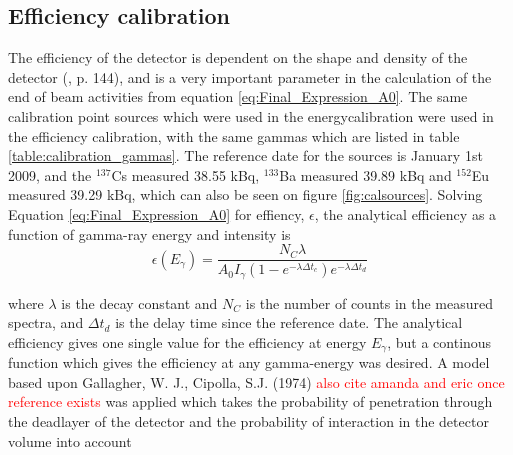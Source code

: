 \subsection{Efficiency calibration}
The efficiency of the detector is dependent on the shape and density of the detector (\cite{Gilmore2008}, p. 144), and is a very important parameter in the calculation of the end of beam activities from equation \ref{eq:Final_Expression_A0}. The same calibration point sources which were used in the energycalibration were used in the efficiency calibration, with the same gammas which are listed in table \ref{table:calibration_gammas}. The reference date for the sources is January 1st 2009, and the $^{137}$Cs measured 38.55 kBq, $^{133}$Ba measured 39.89 kBq and $^{152}$Eu measured 39.29 kBq, which can also be seen on figure \ref{fig:calsources}. \noindent Solving Equation \ref{eq:Final_Expression_A0} for effiency, $\epsilon$, the analytical efficiency as a function of gamma-ray energy and intensity is 
\begin{equation} \label{eq:efficiency_analytical}
    \epsilon(E_\gamma)= \frac{N_C \lambda}{A_0 I_\gamma (1-e^{-\lambda \Delta t_c})e^{-\lambda\Delta t_d}}
\end{equation}

\noindent 
where $\lambda$ is the decay constant and $N_C$ is the number of counts in the measured spectra, and $\Delta t_d$ is the delay time since the reference date. The analytical efficiency gives one single value for the efficiency at energy $E_\gamma$, but a continous function which gives the efficiency at any gamma-energy was desired. A model based upon Gallagher, W. J., Cipolla, S.J. (1974)\cite{Gallagher1974b} \textcolor{red}{also cite amanda and eric once reference exists} was applied which takes the probability of penetration through the deadlayer of the detector and the probability of interaction in the detector volume into account

